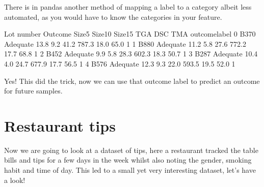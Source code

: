 \documentclass[letterpaper,10pt,english]{jupyterBook}
\begin{document}
\sphinxAtStartPar
There is in pandas another method of mapping a label to a category albeit less automated, as you would have to know the categories in your feature.

\begin{sphinxVerbatim}[commandchars=\\\{\}]
    
\end{sphinxVerbatim}

\begin{sphinxVerbatim}[commandchars=\\\{\}]
  Lot number   Outcome  Size5  Size10  Size15    TGA   DSC   TMA outcome\PYGZus{}label
0       B370  Adequate   13.8     9.2    41.2  787.3  18.0  65.0             1
1       B880  Adequate   11.2     5.8    27.6  772.2  17.7  68.8             1
2       B452  Adequate    9.9     5.8    28.3  602.3  18.3  50.7             1
3       B287  Adequate   10.4     4.0    24.7  677.9  17.7  56.5             1
4       B576  Adequate   12.3     9.3    22.0  593.5  19.5  52.0             1
\end{sphinxVerbatim}

\sphinxAtStartPar
Yes! This did the trick, now we can use that outcome label to predict an outcome for future samples.


\chapter{Restaurant tips}
\label{\detokenize{c2_data_preparation/categorical_encoding:restaurant-tips}}
\sphinxAtStartPar
Now we are going to look at a dataset of tips, here a restaurant tracked the table bills and tips for a few days in the week whilst also noting the gender, smoking habit and time of day.
This led to a small yet very interesting dataset, let’s have a look!

\begin{sphinxVerbatim}[commandchars=\\\{\}]
  
\end{sphinxVerbatim}
\end{document}

